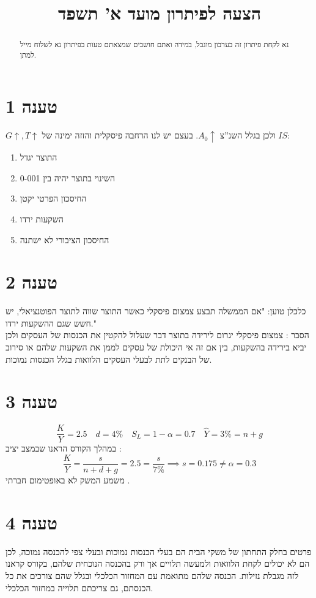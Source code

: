 \documentclass[12pt]{article}
\title{הצעה לפיתרון מועד א' תשפד} %
\renewcommand{\qed}{\hfill\blacksquare}
\begin{document}
\date{}
\maketitle
\begin{abstract}
    נא לקחת פיתרון זה בערבון מוגבל, במידה ואתם חושבים שמצאתם טעות בפיתרון נא לשלוח מייל למתן.
\end{abstract}

\section*{טענה 1}
$G\uparrow,T\uparrow$ ולכן בגלל השנ''צ $A_0\uparrow$. בעצם יש לנו הרחבה פיסקלית והזזה ימינה של $IS$:
\begin{enumerate}
    \item התוצר יגדל
    \item השינוי בתוצר יהיה בין 0-001
    \item החיסכון הפרטי יקטן
    \item השקעות ירדו
    \item החיסכון הציבורי לא ישתנה
\end{enumerate}
\section*{טענה 2}
כלכלן טוען: "אם הממשלה  תבצע צמצום פיסקלי כאשר התוצר שווה לתוצר הפוטנציאלי, יש חשש שגם ההשקעות ירדו." \\
הסבר : צמצום פיסקלי יגרום לירידה בתוצר דבר שעלול להקטין את הכנסות של העסקים ולכן יביא בירידה בהשקעות, בין אם זה אי היכולת של עסקים לממן את השקעות שלהם או סירוב של הבנקים לתת לבעלי העסקים הלוואות בגלל הכנסות נמוכות.
\section*{טענה 3}
\begin{equation*}
    \frac{K}{Y} = 2.5 \quad d = 4\% \quad S_L = 1-\alpha = 0.7 \quad  \widehat Y = 3\% = n+g
\end{equation*}
במהלך הקורס הראנו שבמצב יציב :
\begin{equation*}
    \frac{K}{Y} = \frac{s}{n+d+g} = 2.5 = \frac{s}{7\%} \implies s = 0.175 \neq \alpha = 0.3
\end{equation*}
משמע המשק לא באופטימום חברתי .\qed
\section*{טענה 4}
 פרטים בחלק התחתון של משקי הבית הם בעלי הכנסות נמוכות ובעלי צפי להכנסה נמוכה, לכן הם לא יכולים לקחת הלוואות ולמעשה תלויים אך ורק בהכנסה הנוכחית שלהם, בקורס קראנו לזה מגבלת נזילות. הכנסה שלהם מתואמת עם המחזור הכלכלי ובגלל שהם צורכים את כל הכנסתם, גם צריכתם תלוייה במחזור הכלכלי.
\end{document}
